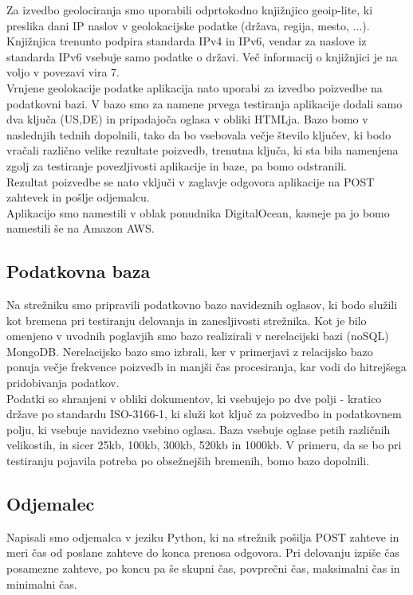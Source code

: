\documentclass[11pt]{article}
\begin{document}
\noindent
Za izvedbo geolociranja smo uporabili odprtokodno knjižnjico geoip-lite, ki preslika dani IP naslov v geolokacijske podatke (država, regija, mesto, ...). Knjižnjica trenunto podpira standarda IPv4 in IPv6, vendar za naslove iz standarda IPv6 vsebuje samo podatke o državi. Več informacij o knjižnjici je na voljo v povezavi vira 7.\\

\noindent
Vrnjene geolokacije podatke aplikacija nato uporabi za izvedbo poizvedbe na podatkovni bazi. V bazo smo za namene prvega testiranja aplikacije dodali samo dva ključa (US,DE) in pripadajoča oglasa v obliki HTMLja. Bazo bomo v naslednjih tednih dopolnili, tako da bo vsebovala večje število ključev, ki bodo vračali različno velike rezultate poizvedb, trenutna ključa, ki sta bila namenjena zgolj za testiranje povezljivosti aplikacije in baze, pa bomo odstranili.\\

\noindent
Rezultat poizvedbe se nato vključi v zaglavje odgovora aplikacije na POST zahtevek in pošlje odjemalcu.\\

\noindent
Aplikacijo smo namestili v oblak ponudnika DigitalOcean, kasneje pa jo bomo namestili še na Amazon AWS.

\subsection{Podatkovna baza}
Na strežniku smo pripravili podatkovno bazo navideznih oglasov, ki bodo služili kot bremena pri testiranju delovanja in zanesljivosti strežnika. Kot je bilo omenjeno v uvodnih poglavjih smo bazo realizirali v nerelacijski bazi (noSQL) MongoDB. Nerelacijsko bazo smo izbrali, ker v primerjavi z relacijsko bazo ponuja večje frekvence poizvedb in manjši čas procesiranja, kar vodi do hitrejšega pridobivanja podatkov.\\
\noindent
Podatki so shranjeni v obliki dokumentov, ki vsebujejo po dve polji - kratico države po standardu ISO-3166-1, ki služi kot ključ za poizvedbo in podatkovnem polju, ki vsebuje navidezno vsebino oglasa. Baza vsebuje oglase petih različnih velikostih, in sicer 25kb, 100kb, 300kb, 520kb in 1000kb. V primeru, da se bo pri testiranju pojavila potreba po obsežnejših bremenih, bomo bazo dopolnili.

\subsection{Odjemalec}
Napisali smo odjemalca v jeziku Python, ki na strežnik pošilja POST zahteve in meri čas od poslane zahteve do konca prenosa odgovora. Pri delovanju izpiše čas posamezne zahteve, po koncu pa še skupni čas, povprečni čas, maksimalni čas in minimalni čas.
\end{document}
